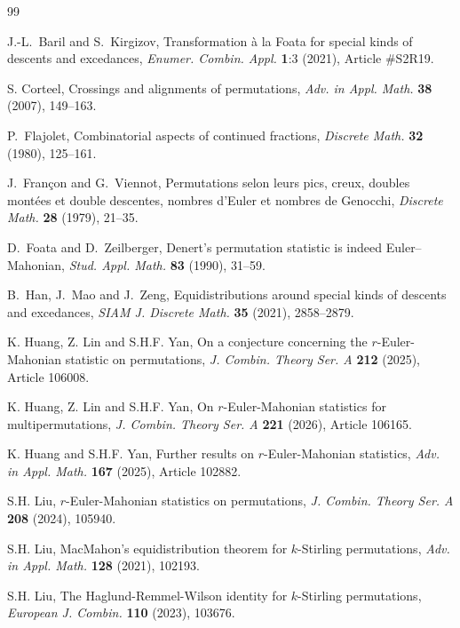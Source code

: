 \documentclass[12pt]{article}
\numberwithin{equation}{section}
\theoremstyle{plain}
\begin{document}
	
	\begin{thebibliography}{99}
		
	 J.-L.~Baril and S.~Kirgizov, Transformation {\`a} la Foata for special kinds of descents and excedances,
	 \emph{Enumer. Combin. Appl.} \textbf{1}:3 (2021), Article \#S2R19.
		
		
	 S. Corteel, Crossings and alignments of permutations, \emph{Adv. in Appl. Math.}  {\bf 38} (2007), 149--163.
	 
	 
	 P.~Flajolet, Combinatorial aspects of continued fractions,
	 \emph{Discrete Math.} \textbf{32} (1980), 125--161.
	 
	 
	 
	 J.~Fran\c con and G.~Viennot, Permutations selon leurs pics, creux, doubles mont\'ees et double descentes, nombres d'Euler et nombres de Genocchi,
	 \emph{Discrete Math.} \textbf{28} (1979),  21--35.
	 
	 
	 D.~Foata and D.~Zeilberger, Denert's permutation statistic is indeed Euler--Mahonian,
	 \emph{Stud. Appl. Math.} \textbf{83} (1990), 31--59.
	 
	 B.~Han, J.~Mao and J.~Zeng, Equidistributions around special kinds of descents and excedances,
	 \emph{SIAM J. Discrete Math.} \textbf{35} (2021), 2858--2879.
	 
	 K. Huang, Z. Lin and S.H.F. Yan, On a conjecture concerning the $r$-Euler-Mahonian statistic on permutations,
	 {\em J. Combin. Theory Ser. A} {\bf 212} (2025), Article 106008.
	 
	 K. Huang, Z. Lin and S.H.F. Yan, On $r$-Euler-Mahonian statistics for multipermutations,
	 {\em J. Combin. Theory Ser. A}  {\bf 221} (2026), Article 106165.
	 
	 K. Huang and S.H.F. Yan, Further results on $r$-Euler-Mahonian statistics,
	 {\em Adv. in Appl. Math.} {\bf 167} (2025), Article 102882.
	 
	 S.H. Liu, $r$-Euler-Mahonian statistics on permutations,
	 {\em J. Combin. Theory Ser. A}  {\bf 208} (2024), 105940.
	
	 S.H. Liu, MacMahon's equidistribution theorem for $k$-Stirling permutations,
	 {\em Adv. in Appl. Math.} {\bf 128} (2021), 102193.
	 
	 S.H. Liu, The Haglund-Remmel-Wilson identity for $k$-Stirling permutations,
	 {\em European J. Combin.} {\bf 110} (2023), 103676.
	 

\end{thebibliography}
\end{document}
